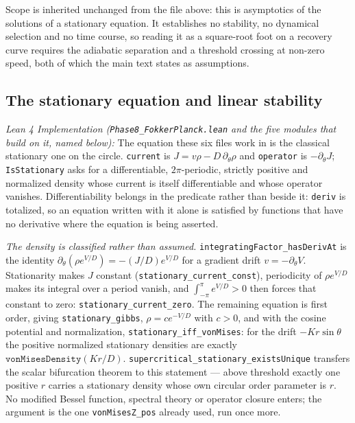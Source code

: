 \documentclass{article}
\begin{document}
Scope is inherited unchanged from the file above: this is asymptotics of the solutions of a stationary equation. It establishes no stability, no dynamical selection and no time course, so reading it as a square-root foot on a recovery curve requires the adiabatic separation and a threshold crossing at non-zero speed, both of which the main text states as assumptions.

\subsection{The stationary equation and linear stability}

\textit{Lean 4 Implementation (\nolinkurl{Phase8_FokkerPlanck.lean} and the five modules that build on it, named below):} The equation these six files work in is the classical stationary one on the circle. \texttt{current} is $J = v\rho - D\,\partial_\theta\rho$ and \texttt{operator} is $-\partial_\theta J$; \texttt{IsStationary} asks for a differentiable, $2\pi$-periodic, strictly positive and normalized density whose current is itself differentiable and whose operator vanishes. Differentiability belongs in the predicate rather than beside it: \texttt{deriv} is totalized, so an equation written with it alone is satisfied by functions that have no derivative where the equation is being asserted.

\textit{The density is classified rather than assumed.} \nolinkurl{integratingFactor_hasDerivAt} is the identity $\partial_\theta(\rho e^{V/D}) = -(J/D)e^{V/D}$ for a gradient drift $v = -\partial_\theta V$. Stationarity makes $J$ constant (\nolinkurl{stationary_current_const}), periodicity of $\rho e^{V/D}$ makes its integral over a period vanish, and $\int_{-\pi}^{\pi} e^{V/D} > 0$ then forces that constant to zero: \nolinkurl{stationary_current_zero}. The remaining equation is first order, giving \nolinkurl{stationary_gibbs}, $\rho = ce^{-V/D}$ with $c>0$, and with the cosine potential and normalization, \nolinkurl{stationary_iff_vonMises}: for the drift $-Kr\sin\theta$ the positive normalized stationary densities are exactly $\texttt{vonMisesDensity}(Kr/D)$. \nolinkurl{supercritical_stationary_existsUnique} transfers the scalar bifurcation theorem to this statement --- above threshold exactly one positive $r$ carries a stationary density whose own circular order parameter is $r$. No modified Bessel function, spectral theory or operator closure enters; the argument is the one \nolinkurl{vonMisesZ_pos} already used, run once more.
\end{document}
